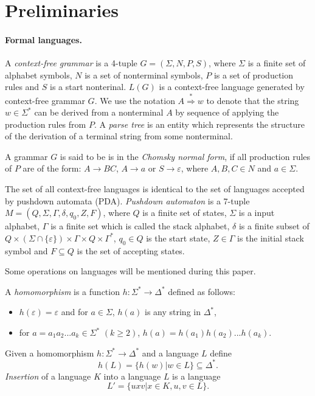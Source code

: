\section{Preliminaries}
\label{sec:prel}
\label{preliminaries}
\paragraph{Formal languages.} 
A \textit{context-free grammar} is a 4-tuple $G = (\Sigma, N, P, S)$, where $\Sigma$ is a finite set of alphabet symbols,  $N$ is a set of nonterminal symbols, $P$ is a set of production rules and $S$ is a start nonterinal. $L(G)$ is a context-free language generated by context-free grammar $G$. We use the notation $A \stackrel {*}{\Rightarrow } w$  to denote that the string $w \in \Sigma^*$ can be derived from a nonterminal $A$ by sequence of applying the production rules from $P$. A \textit{parse tree} is an entity which represents the structure of the derivation of a terminal string from some nonterminal.


A grammar $G$ is said to be is in the \textit{Chomsky normal form}, if all production rules of $P$ are of the form:
$A \rightarrow BC$, $A \rightarrow a$ or $S \rightarrow \varepsilon$, where $A, B, C \in N$ and $a \in \Sigma$. 


The set of all context-free languages is identical to the set of languages accepted by pushdown automata (PDA). \textit{Pushdown automaton} is a 7-tuple $M = (Q, \Sigma, \Gamma, \delta, q_0, Z, F)$, where $Q$ is a finite set of states, $\Sigma$ is a input alphabet, $\Gamma$ is a finite set which is called the stack alphabet, $\delta$ is a finite subset of $Q \times (\Sigma \cap \{\varepsilon\}) \times \Gamma \times Q \times \Gamma^*$,
$q_{0}\in Q$ is the start state, $Z \in \Gamma$ is the initial stack symbol and
$F\subseteq Q$ is the set of accepting states.


Some operations on languages will be mentioned during this paper.


A \textit{homomorphism} is a function $h: \Sigma^* \rightarrow \Delta^*$ defined as follows: 
\begin{itemize}
\item $h(\varepsilon) = \varepsilon$ and for $a \in \Sigma$, $h(a)$ is any string in $\Delta^*$,
\item for $a = a_1a_2 ... a_k \in \Sigma^*$ $(k \ge 2)$, $h(a) = h(a_1)h(a_2)... h(a_k)$.
\end{itemize}
Given a homomorphism $h: \Sigma^* \rightarrow \Delta^*$ and a language $L$ define 
$$h(L)= \{h(w) | w \in L\} \subseteq \Delta^*.$$
\textit{Insertion} of a language $K$ into a language $L$ is a language $$L' = \{uxv|x \in K, u, v \in L\}.$$ 


